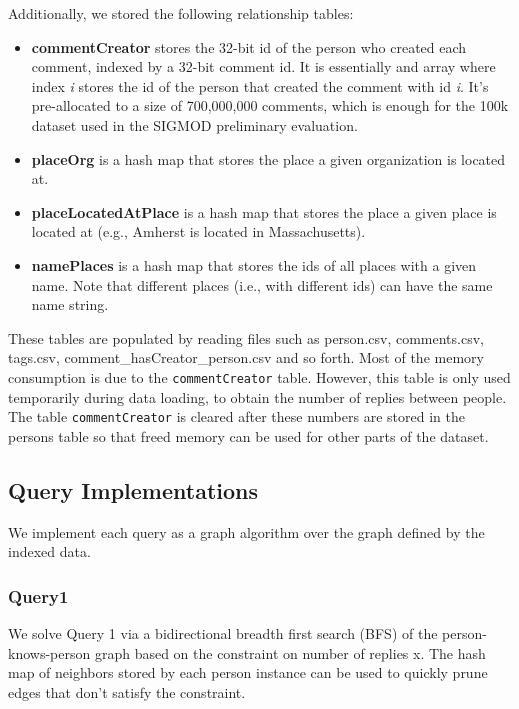 \documentclass{article}
\begin{document}
Additionally, we stored the following relationship tables: 

\begin{itemize}
\item \textbf{commentCreator} stores the 32-bit id of the person who created each comment, indexed by a 32-bit comment id. It is essentially and array where index \emph{i} stores the id of the person that created the comment with id \emph{i}. It's pre-allocated to a size of 700,000,000 comments, which is enough for the 100k dataset used in the SIGMOD preliminary evaluation. 
\item \textbf{placeOrg} is a hash map that stores the place a given organization is located at.  
\item \textbf{placeLocatedAtPlace} is a hash map that stores the place a given place is located at (e.g., Amherst is located in Massachusetts).  
\item \textbf{namePlaces} is a hash map that stores the ids of all places with a given name. Note that different places (i.e., with different ids) can have the same name string.
\end{itemize}

These tables are populated by reading files such as person.csv,
comments.csv, tags.csv, comment\_hasCreator\_person.csv and so forth.
Most of the memory consumption is due to the \texttt{commentCreator}
table.  However, this table is only used temporarily during data
loading, to obtain the number of replies between people. The table
\texttt{commentCreator} is cleared after these numbers are stored in
the persons table so that freed memory can be used for other parts of
the dataset.

\subsection{Query Implementations}

We implement each query as a graph algorithm over the graph defined by
the indexed data.

\subsubsection{Query1}
We solve Query 1 via a bidirectional breadth first search (BFS) of the
person-knows-person graph based on the constraint on number of replies
x.  The hash map of neighbors stored by each person instance can be used
to quickly prune edges that don't satisfy the constraint. 
\end{document}

